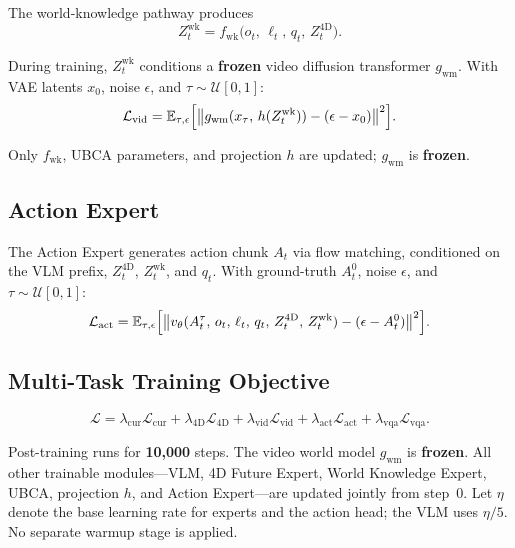 The world-knowledge pathway produces
\begin{equation}
Z^{\mathrm{wk}}_t = f_{\mathrm{wk}}\bigl(o_t,\, \ell_t,\, q_t,\, Z^{\mathrm{4D}}_t\bigr).
\label{eq:wk}
\end{equation}

During training, $Z^{\mathrm{wk}}_t$ conditions a \textbf{frozen} video diffusion transformer $g_{\mathrm{wm}}$. With VAE latents $x_0$, noise $\epsilon$, and $\tau \sim \mathcal{U}[0,1]$:
\begin{equation}
\mathcal{L}_{\mathrm{vid}} = \mathbb{E}_{\tau,\epsilon}\Bigl[
    \bigl\| g_{\mathrm{wm}}(x_\tau,\, h(Z^{\mathrm{wk}}_t)) - (\epsilon - x_0) \bigr\|^2
\Bigr].
\label{eq:lossvid}
\end{equation}

Only $f_{\mathrm{wk}}$, UBCA parameters, and projection $h$ are updated; $g_{\mathrm{wm}}$ is \textbf{frozen}.

\subsection{Action Expert}
\label{sec:action}

The Action Expert generates action chunk $A_t$ via flow matching, conditioned on the VLM prefix, $Z^{\mathrm{4D}}_t$, $Z^{\mathrm{wk}}_t$, and $q_t$. With ground-truth $A^0_t$, noise $\epsilon$, and $\tau \sim \mathcal{U}[0,1]$:
\begin{equation}
\mathcal{L}_{\mathrm{act}} = \mathbb{E}_{\tau,\epsilon}\Bigl[
    \bigl\| v_\theta(A^\tau_t,\, o_t,\, \ell_t,\, q_t,\, Z^{\mathrm{4D}}_t,\, Z^{\mathrm{wk}}_t) - (\epsilon - A^0_t) \bigr\|^2
\Bigr].
\label{eq:lossact}
\end{equation}

\subsection{Multi-Task Training Objective}
\label{sec:training}

\begin{equation}
\mathcal{L} = \lambda_{\mathrm{cur}}\mathcal{L}_{\mathrm{cur}}
    + \lambda_{\mathrm{4D}}\mathcal{L}_{\mathrm{4D}}
    + \lambda_{\mathrm{vid}}\mathcal{L}_{\mathrm{vid}}
    + \lambda_{\mathrm{act}}\mathcal{L}_{\mathrm{act}}
    + \lambda_{\mathrm{vqa}}\mathcal{L}_{\mathrm{vqa}}.
\label{eq:losstotal}
\end{equation}

Post-training runs for \textbf{10{,}000} steps. The video world model $g_{\mathrm{wm}}$ is \textbf{frozen}. All other trainable modules---VLM, 4D Future Expert, World Knowledge Expert, UBCA, projection $h$, and Action Expert---are updated jointly from step~0. Let $\eta$ denote the base learning rate for experts and the action head; the VLM uses $\eta/5$. No separate warmup stage is applied.


